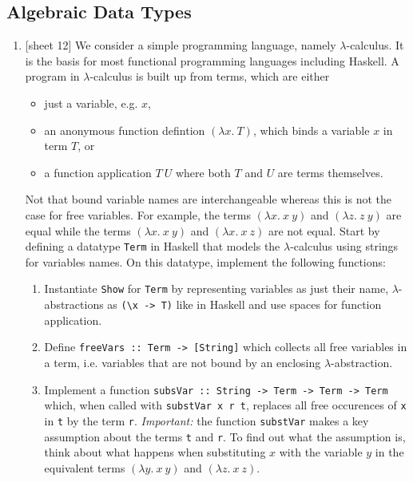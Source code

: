 \documentclass{article}
\def\code#1{\texttt{#1}}
\begin{document}
\subsection{Algebraic Data Types}
\begin{enumerate}
    \item {[sheet 12]} We consider a simple programming language, namely $\lambda$-calculus. It is the basis for most functional programming languages including Haskell. A program in $\lambda$-calculus is built up from terms, which are either
        \begin{itemize}
            \item just a variable, e.g. $x$,
            \item an anonymous function defintion $(\lambda x.\ T)$, which binds a variable $x$ in term $T$, or
            \item a function application $T\ U$ where both $T$ and $U$ are terms themselves.
        \end{itemize}
        Not that bound variable names are interchangeable whereas this is not the case for free variables. For example, the terms $(\lambda x.\ x\ y)$ and $(\lambda z.\ z\ y)$ are equal while the terms $(\lambda x.\ x\ y)$ and $(\lambda x.\ x\ z)$ are not equal. Start by defining a datatype \code{Term} in Haskell that models the $\lambda$-calculus using strings for variables names. On this datatype, implement the following functions:
        \begin{enumerate}
            \item Instantiate \code{Show} for \code{Term} by representing variables as just their name, $\lambda$-abstractions as \code{(\textbackslash x -> T)} like in Haskell and use spaces for function application.
            \item Define \code{freeVars :: Term -> [String]} which collects all free variables in a term, i.e. variables that are not bound by an enclosing $\lambda$-abstraction.
            \item Implement a function \code{subsVar :: String -> Term -> Term -> Term} which, when called with \code{substVar x r t}, replaces all free occurences of \code{x} in \code{t} by the term \code{r}. \textit{Important:} the function \code{substVar} makes a key assumption about the terms \code{t} and \code{r}. To find out what the assumption is, think about what happens when substituting $x$ with the variable $y$ in the equivalent terms $(\lambda y.\ x\ y)$ and $(\lambda z.\ x\ z)$.
        \end{enumerate}


\end{enumerate}
\end{document}
